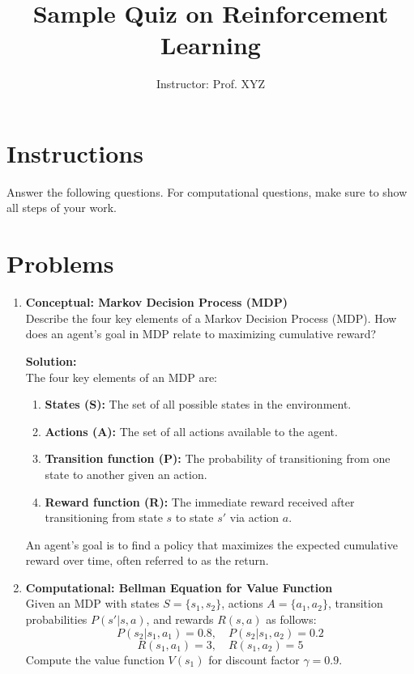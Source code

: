 \documentclass{article}
\title{Sample Quiz on Reinforcement Learning}
\author{Instructor: Prof. XYZ}
\date{}
\begin{document}
\maketitle

\section*{Instructions}
Answer the following questions. For computational questions, make sure to show all steps of your work.

\section*{Problems}

\begin{enumerate}[label=Q\arabic*.]

\item \textbf{Conceptual: Markov Decision Process (MDP)} \\
Describe the four key elements of a Markov Decision Process (MDP). How does an agent's goal in MDP relate to maximizing cumulative reward?

\textbf{Solution:} \\
The four key elements of an MDP are:
\begin{enumerate}
    \item \textbf{States (S):} The set of all possible states in the environment.
    \item \textbf{Actions (A):} The set of all actions available to the agent.
    \item \textbf{Transition function (P):} The probability of transitioning from one state to another given an action.
    \item \textbf{Reward function (R):} The immediate reward received after transitioning from state $s$ to state $s'$ via action $a$.
\end{enumerate}
An agent's goal is to find a policy that maximizes the expected cumulative reward over time, often referred to as the return.

\item \textbf{Computational: Bellman Equation for Value Function} \\
Given an MDP with states $S = \{s_1, s_2\}$, actions $A = \{a_1, a_2\}$, transition probabilities $P(s'|s, a)$, and rewards $R(s, a)$ as follows:
\[
P(s_2|s_1, a_1) = 0.8, \quad P(s_2|s_1, a_2) = 0.2
\]
\[
R(s_1, a_1) = 3, \quad R(s_1, a_2) = 5
\]
Compute the value function $V(s_1)$ for discount factor $\gamma = 0.9$.


\end{enumerate}
\end{document}
